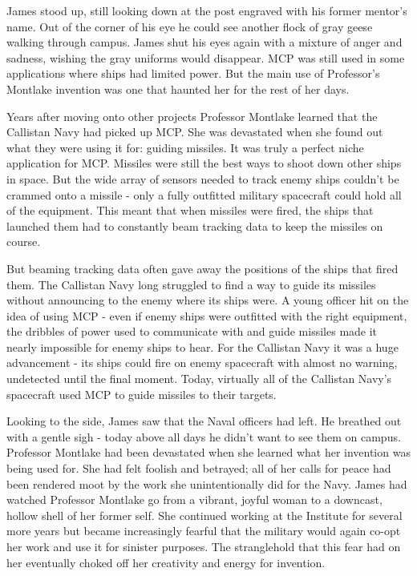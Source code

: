 \documentclass[openany, 12pt]{book} %
\begin{document}
James stood up, still looking down at the post engraved with his former mentor's name. Out of the corner of his eye he could see another flock of gray geese walking through campus. James shut his eyes again with a mixture of anger and sadness, wishing the gray uniforms would disappear. MCP was still used in some applications where ships had limited power. But the main use of Professor's Montlake invention was one that haunted her for the rest of her days.

Years after moving onto other projects Professor Montlake learned that the Callistan Navy had picked up MCP. She was devastated when she found out what they were using it for: guiding missiles. It was truly a perfect niche application for MCP. Missiles were still the best ways to shoot down other ships in space. But the wide array of sensors needed to track enemy ships couldn't be crammed onto a missile - only a fully outfitted military spacecraft could hold all of the equipment. This meant that when missiles were fired, the ships that launched them had to constantly beam tracking data to keep the missiles on course.

But beaming tracking data often gave away the positions of the ships that fired them. The Callistan Navy long struggled to find a way to guide its missiles without announcing to the enemy where its ships were. A young officer hit on the idea of using MCP - even if enemy ships were outfitted with the right equipment, the dribbles of power used to communicate with and guide missiles made it nearly impossible for enemy ships to hear. For the Callistan Navy it was a huge advancement - its ships could fire on enemy spacecraft with almost no warning, undetected until the final moment. Today, virtually all of the Callistan Navy's spacecraft used MCP to guide missiles to their targets.

Looking to the side, James saw that the Naval officers had left. He breathed out with a gentle sigh - today above all days he didn't want to see them on campus. Professor Montlake had been devastated when she learned what her invention was being used for. She had felt foolish and betrayed; all of her calls for peace had been rendered moot by the work she unintentionally did for the Navy. James had watched Professor Montlake go from a vibrant, joyful woman to a downcast, hollow shell of her former self. She continued working at the Institute for several more years but became increasingly fearful that the military would again co-opt her work and use it for sinister purposes. The stranglehold that this fear had on her eventually choked off her creativity and energy for invention.
\end{document}
